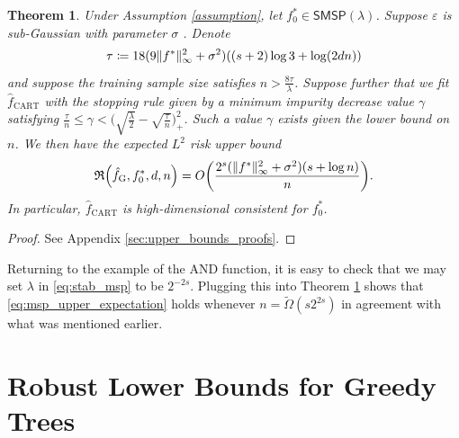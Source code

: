 \documentclass[11pt]{article}
\newtheorem{theorem}{Theorem}[section]
\DeclarePairedDelimiter{\paren}{(}{)}
\DeclarePairedDelimiter{\norm}{\|}{\|}
\newcommand{\sparsity}{s}
\newcommand{\nfeats}{d}
\newcommand{\nsamples}{n}
\newcommand{\data}[1][n]{\mathcal{D}_{#1}}
\newcommand{\fgreedy}{\hat{f}_{\operatorname{G}}}
\newcommand{\fcart}{\hat{f}_{\operatorname{CART}}}
\newcommand{\stabmsp}{\textsf{SMSP}}
\newcommand{\objective}{\mathfrak{R}}
\begin{document}
\begin{theorem}
    \label{thm:MSP_upper_bound}
    Under Assumption \ref{assumption}, let $f_0^* \in \stabmsp(\lambda)$.
    Suppose $\varepsilon$ is sub-Gaussian with parameter $\sigma$ \citep{wainwright2019high}.
    Denote 
    \begin{equation}
        \tau \coloneqq 18(9\norm{f^*}_\infty^2 + \sigma^2)\paren*{(s+2)\log 3 + \log(2\nfeats\nsamples)}
    \end{equation}
    and suppose the training sample size satisfies $n > \frac{8\tau}{\lambda}$.
    Suppose further that we fit $\fcart$ with the stopping rule given by a minimum impurity decrease value $\gamma$ satisfying $\frac{\tau}{n} \leq \gamma < \Big(\sqrt{\frac{\lambda}{2}} - \sqrt{\frac{\tau}{n}}\Big)_+^2$.
    Such a value $\gamma$ exists given the lower bound on $\nsamples$.
    We then have the expected $L^2$ risk upper bound
    \begin{equation}
        \label{eq:msp_upper_expectation}
        \objective\paren*{\fgreedy, f^*_0,\nfeats,\nsamples} = O\paren*{\frac{2^{\sparsity}(\norm{f^*}_\infty^2 + \sigma^2)(\sparsity + \log \nsamples)}{n}}.
    \end{equation}
    In particular, $\fcart$ is high-dimensional consistent for $f_0^*$.
\end{theorem}

\begin{proof}
    See Appendix \ref{sec:upper_bounds_proofs}.
\end{proof}

Returning to the example of the AND function, it is easy to check that we may set $\lambda$ in \eqref{eq:stab_msp} to be $2^{-2\sparsity}$.
Plugging this into Theorem \ref{thm:MSP_upper_bound} shows that \eqref{eq:msp_upper_expectation} holds whenever $\nsamples = \tilde{\Omega}(\sparsity2^{2\sparsity})$ in agreement with what was mentioned earlier.

\section{Robust Lower Bounds for Greedy Trees} 
\label{sec:robust_lower_bounds}
\end{document}

